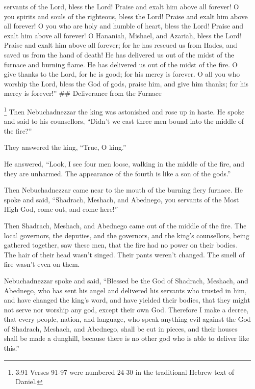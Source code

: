 servants of the Lord, bless the Lord! Praise and exalt him above all
forever!  O you spirits and souls of the righteous, bless
the Lord! Praise and exalt him above all forever!  O you
who are holy and humble of heart, bless the Lord! Praise and exalt him
above all forever!  O Hananiah, Mishael, and Azariah, bless
the Lord! Praise and exalt him above all forever; for he has rescued us
from Hades, and saved us from the hand of death! He has delivered us out
of the midst of the furnace and burning flame. He has delivered us out
of the midst of the fire.  O give thanks to the Lord, for
he is good; for his mercy is forever.  O all you who
worship the Lord, bless the God of gods, praise him, and give him
thanks; for his mercy is forever!'' \#\# Deliverance from the Furnace

 \footnote{3:91 Verses 91-97 were numbered 24-30 in the
  traditional Hebrew text of Daniel.} Then Nebuchadnezzar the king was
astonished and rose up in haste. He spoke and said to his counsellors,
``Didn't we cast three men bound into the middle of the fire?''

They answered the king, ``True, O king.''

 He answered, ``Look, I see four men loose, walking in the
middle of the fire, and they are unharmed. The appearance of the fourth
is like a son of the gods.''

 Then Nebuchadnezzar came near to the mouth of the burning
fiery furnace. He spoke and said, ``Shadrach, Meshach, and Abednego, you
servants of the Most High God, come out, and come here!''

Then Shadrach, Meshach, and Abednego came out of the middle of the fire.
 The local governors, the deputies, and the governors, and
the king's counsellors, being gathered together, saw these men, that the
fire had no power on their bodies. The hair of their head wasn't singed.
Their pants weren't changed. The smell of fire wasn't even on them.

 Nebuchadnezzar spoke and said, ``Blessed be the God of
Shadrach, Meshach, and Abednego, who has sent his angel and delivered
his servants who trusted in him, and have changed the king's word, and
have yielded their bodies, that they might not serve nor worship any
god, except their own God.  Therefore I make a decree, that
every people, nation, and language, who speak anything evil against the
God of Shadrach, Meshach, and Abednego, shall be cut in pieces, and
their houses shall be made a dunghill, because there is no other god who
is able to deliver like this.''

